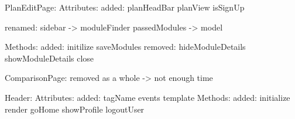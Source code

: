 PlanEditPage:
	Attributes:
		added:
			planHeadBar
			planView
			isSignUp
	
		renamed: 
			sidebar -> moduleFinder
			passedModules -> model
	
	
	Methods:
		added:
			initilize
			saveModules
		removed:
			hideModuleDetails
			showModuleDetails
			close

ComparisonPage:
	removed as a whole -> not enough time
	
Header:
	Attributes:
		added:
			tagName
			events
			template
	Methods:
		added:
			initialize
			render
			goHome
			showProfile
			logoutUser


